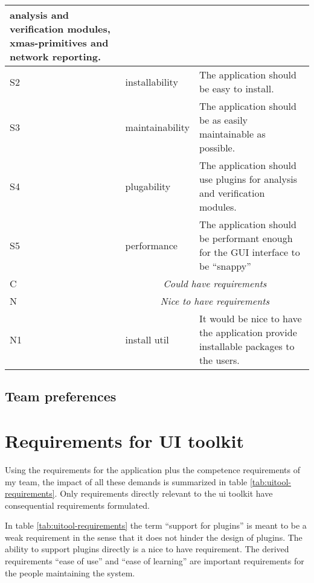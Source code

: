 \begin{center}
\begin{tabular}{|l|p{7em}|p{23em}|}
				analysis and verification modules, xmas-primitives and
				network reporting.
		\\\hline
	S2	& installability & The application should be easy to install.
		\\\hline
	S3	& maintainability & The application should be as easily maintainable as possible.
		\\\hline
	S4	& plugability	& The application should use plugins for analysis and
				verification modules.
		\\\hline
	S5	& performance	& The application should be performant enough for the GUI
				    interface to be ``snappy''
		\\\hline
	C	& \multicolumn{2}{c|}{\sf\emph{\large Could have requirements}}
		\\\hline
	N	& \multicolumn{2}{c|}{\sf\emph{\large Nice to have requirements}}
		\\\hline
	N1	& install util	& It would be nice to have the application provide
				installable packages to the users.
		\\\hline
    \end{tabular}
    \label{tab:appl-requirements}
\end{center}

\subsection{Team preferences}



\section{Requirements for UI toolkit}

Using the requirements for the application plus the competence requirements of
my team, the impact of all these demands is summarized in table
\ref{tab:uitool-requirements}. Only requirements directly relevant to the ui
toolkit have consequential requirements formulated.

In table \ref{tab:uitool-requirements} the term ``support for plugins'' is
meant to be a weak requirement in the sense that it does not hinder the design
of plugins. The ability to support plugins directly is a nice to have
requirement. The derived requirements ``ease of use'' and ``ease of learning''
are important requirements for the people maintaining the system.

